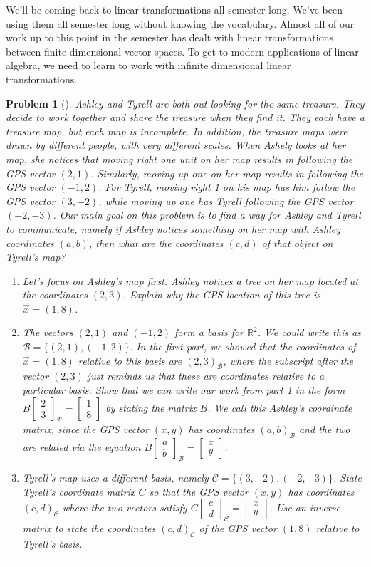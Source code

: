\documentclass[letterpaper,oneside]{book}%
\theoremstyle{plain}
\theoremstyle{box}
\theoremstyle{problem}
\newtheorem{problemnum}{Problem}[chapter]
\newenvironment{problem}[1][]{\begin{problemnum}[#1]}{\end{problemnum}\nopagebreak\hrule\bigskip}
\newcommand{\bvec}[1]{\begin{bmatrix} #1 \end{bmatrix}}
\begin{document}
We'll be coming back to linear transformations all semester long. We've been using them all semester long without knowing the vocabulary. 
Almost all of our work up to this point in the semester has dealt with linear transformations between finite dimensional vector spaces. To get to modern applications of linear algebra, we need to learn to work with infinite dimensional linear transformations. 


\begin{problem}
Ashley and Tyrell are both out looking for the same treasure. They decide to work together and share the treasure when they find it.  They each have a treasure map, but each map is incomplete. In addition, the treasure maps were drawn by different people, with very different scales. When Ashely looks at her map, she notices that moving right one unit on her map results in following the GPS vector $(2,1)$. Similarly, moving up one on her map results in following the GPS vector $(-1,2)$.  For Tyrell, moving right 1 on his map has him follow the GPS vector $(3,-2)$, while moving up one has Tyrell following the GPS vector $(-2,-3)$. Our main goal on this problem is to find a way for Ashley and Tyrell to communicate, namely if Ashley notices something on her map with Ashley coordinates $(a,b)$, then what are the coordinates $(c,d)$ of that object on Tyrell's map? 
\begin{enumerate}
 \item Let's focus on Ashley's map first. Ashley notices a tree on her map located at the coordinates $(2,3)$. Explain why the GPS location of this tree is $\vec x = (1,8)$. 
 \item The vectors $(2,1)$ and $(-1,2)$ form a basis for $\mathbb{R}^2$. We could write this as $\mathscr{B} =\{(2,1),(-1,2)\}$. In the first part, we showed that the coordinates of $\vec x = (1,8)$ relative to this basis are $(2,3)_{\mathscr{B}}$, where the subscript after the vector $(2,3)$ just reminds us that these are coordinates relative to a particular basis. Show that we can write our work from part 1 in the form $B\bvec{2\\3}_{\mathscr{B}}=\bvec{1\\8}$ by stating the matrix $B$. We call this Ashley's coordinate matrix, since the GPS vector $(x,y)$ has coordinates $(a,b)_{\mathscr{B}}$ and the two are related via the equation $B\bvec{a\\b}_{\mathscr{B}}=\bvec{x\\y}$. 
 \item Tyrell's map uses a different basis, namely $\mathscr{C} = \{(3,-2),(-2,-3)\}$. State Tyrell's coordinate matrix $C$ so that the GPS vector $(x,y)$ has coordinates $(c,d)_{\mathscr{C}}$ where the two vectors satisfy  $C\bvec{c\\d}_{\mathscr{C}}=\bvec{x\\y}$. Use an inverse matrix to state the coordinates $(c,d)_{\mathscr{C}}$ of the GPS vector $(1,8)$ relative to Tyrell's basis.

\end{enumerate}
\end{problem}
\end{document}
